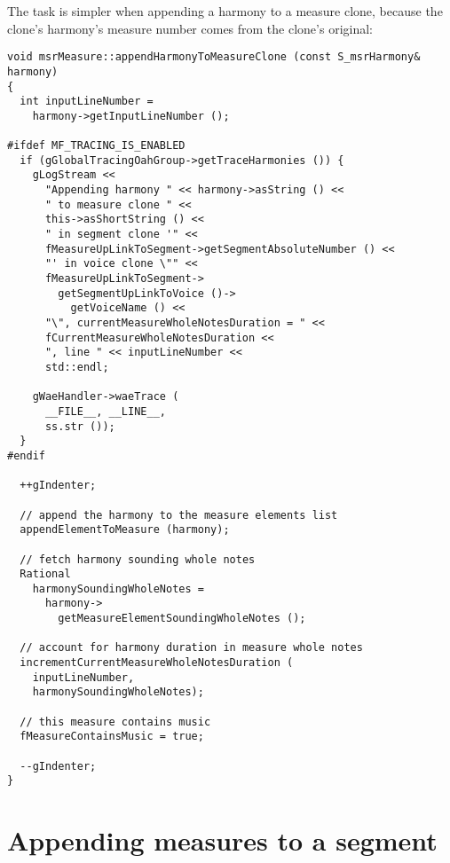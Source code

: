 The task is simpler when appending a harmony to a measure clone, because the clone's harmony's measure number comes from the clone's original:
\begin{lstlisting}[language=CPlusPlus]
void msrMeasure::appendHarmonyToMeasureClone (const S_msrHarmony& harmony)
{
  int inputLineNumber =
    harmony->getInputLineNumber ();

#ifdef MF_TRACING_IS_ENABLED
  if (gGlobalTracingOahGroup->getTraceHarmonies ()) {
    gLogStream <<
      "Appending harmony " << harmony->asString () <<
      " to measure clone " <<
      this->asShortString () <<
      " in segment clone '" <<
      fMeasureUpLinkToSegment->getSegmentAbsoluteNumber () <<
      "' in voice clone \"" <<
      fMeasureUpLinkToSegment->
        getSegmentUpLinkToVoice ()->
          getVoiceName () <<
      "\", currentMeasureWholeNotesDuration = " <<
      fCurrentMeasureWholeNotesDuration <<
      ", line " << inputLineNumber <<
      std::endl;

    gWaeHandler->waeTrace (
      __FILE__, __LINE__,
      ss.str ());
  }
#endif

  ++gIndenter;

  // append the harmony to the measure elements list
  appendElementToMeasure (harmony);

  // fetch harmony sounding whole notes
  Rational
    harmonySoundingWholeNotes =
      harmony->
        getMeasureElementSoundingWholeNotes ();

  // account for harmony duration in measure whole notes
  incrementCurrentMeasureWholeNotesDuration (
    inputLineNumber,
    harmonySoundingWholeNotes);

  // this measure contains music
  fMeasureContainsMusic = true;

  --gIndenter;
}
\end{lstlisting}


\section{Appending measures to a segment}

